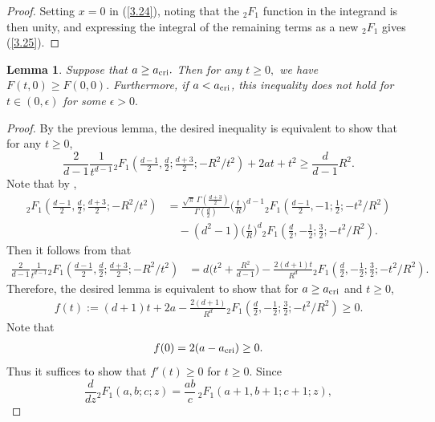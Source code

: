 \documentclass[10pt]{amsart}
\theoremstyle{plain}
\newtheorem{lem}[thm]{Lemma}
\theoremstyle{remark}
\numberwithin{equation}{section}
\begin{document}
\begin{proof}
Setting $x=0$ in (\ref{3.24}), noting that the ${}_2F_1$ function in the integrand is then unity, and expressing the integral of the remaining terms as a new ${}_2F_1$ gives (\ref{3.25}).
\end{proof}
 

\begin{lem} \label{Lem_EL for the vertical}
Suppose that $a \ge a_{ \rm cri }.$ Then for any $t \ge 0,$ we have $F(t,0) \ge F(0,0). $  
Furthermore, if $a< a_{ \rm cri }$, this inequality does not hold for $t \in (0,\epsilon)$ for some $\epsilon>0.$
\end{lem}
\begin{proof}
By the previous lemma, the desired inequality is equivalent to show that for any $t \ge 0$,
\begin{equation}
\frac{2}{d-1}  \frac{1}{ t^{d-1} }   {}_2F_1( \tfrac{d-1}{2},\tfrac{d}{2};\tfrac{d+3}{2};-R^2/t^2 ) +2at+t^2  \ge  \frac{d}{d-1} R^2. 
\end{equation}
Note that by \cite[Eq.(15.8.2)]{NIST}, 
\begin{align*}
{}_2F_1( \tfrac{d-1}{2},\tfrac{d}{2};\tfrac{d+3}{2};-R^2/t^2 ) &= \frac{ \sqrt{\pi} \, \Gamma(\frac{d+3}{2})   }{ \Gamma(\frac{d}{2})  } \Big( \frac{t}{R}\Big)^{d-1} {}_2F_1( \tfrac{d-1}{2},-1;\tfrac12; -t^2/R^2 ) 
\\
& \quad -(d^2-1)  \Big( \frac{t}{R}\Big)^{d} {}_2F_1( \tfrac{d}{2},-\tfrac12;\tfrac32; -t^2/R^2 ). 
\end{align*}
Then it follows from \cite[Eq.(15.2.4)]{NIST} that 
\begin{align*}
\frac{2}{d-1}  \frac{1}{ t^{d-1} }  {}_2F_1( \tfrac{d-1}{2},\tfrac{d}{2};\tfrac{d+3}{2};-R^2/t^2 )  
&= d\Big( t^2+\frac{R^2}{d-1} \Big)  -    \frac{  2(d+1)t }{R^d}  {}_2F_1( \tfrac{d}{2},-\tfrac12;\tfrac32; -t^2/R^2 ). 
\end{align*}
Therefore, the desired lemma is equivalent to show that for $a \ge a_{ \rm cri }$ and $t \ge 0$,
\begin{align}
f(t):=(d+1)t+2a  -    \frac{  2(d+1) }{R^d}  {}_2F_1( \tfrac{d}{2},-\tfrac12;\tfrac32; -t^2/R^2 ) \ge 0. 
\end{align}
Note that  
\begin{align}
f(0)= 2(a-a_{ \rm cri }) \ge 0.  
\end{align}
Thus it suffices to show that $f'(t) \ge 0$ for $t \ge 0$.
Since 
\begin{equation}
\frac{d}{dz} {}_2F_1(a,b;c;z)= \frac{ab}{c}\, {}_2F_1( a+1,b+1;c+1;z ), 
\end{equation}

\end{proof}
\end{document}

